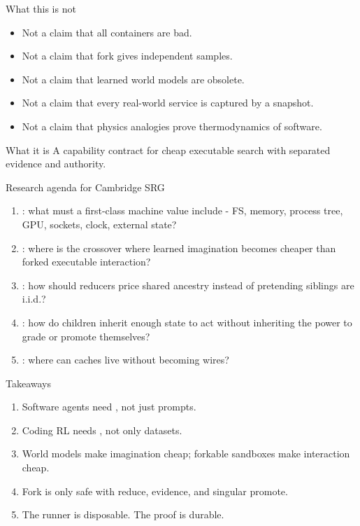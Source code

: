 \begin{frame}{What this is not}
\begin{itemize}
  \item Not a claim that all containers are bad.
  \item Not a claim that fork gives independent samples.
  \item Not a claim that learned world models are obsolete.
  \item Not a claim that every real-world service is captured by a snapshot.
  \item Not a claim that physics analogies prove thermodynamics of software.
\end{itemize}
\vspace{0.7em}
\begin{block}{What it is}
A capability contract for cheap executable search with separated evidence and authority.
\end{block}
\end{frame}

\begin{frame}{Research agenda for Cambridge SRG}
\large
\begin{enumerate}
  \item {}: what must a first-class machine value include - FS, memory, process tree, GPU, sockets, clock, external state?
  \item {}: where is the crossover where learned imagination becomes cheaper than forked executable interaction?
  \item {}: how should reducers price shared ancestry instead of pretending siblings are i.i.d.?
  \item {}: how do children inherit enough state to act without inheriting the power to grade or promote themselves?
  \item {}: where can caches live without becoming wires?
\end{enumerate}
\end{frame}

\begin{frame}{Takeaways}
\begin{enumerate}
  \item Software agents need , not just prompts.
  \item Coding RL needs , not only datasets.
  \item World models make imagination cheap; forkable sandboxes make interaction cheap.
  \item Fork is only safe with reduce, evidence, and singular promote.
  \item The runner is disposable. The proof is durable.
\end{enumerate}
\vspace{0.8em}
\begin{center}
\Large {}
\end{center}
\end{frame}
